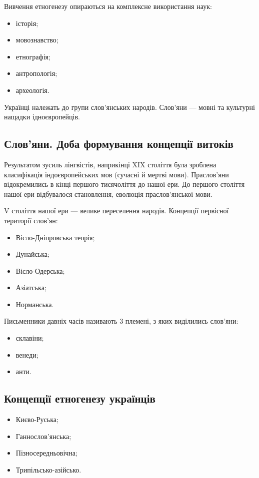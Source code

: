 \documentclass[a5paper,10pt,titlepage,pdftex,headsepline]{scrartcl}
\begin{document}
Вивчення етногенезу опираються на комплексне використання наук:
\begin{itemize}
	\item історія;
	\item мовознавство;
	\item етнографія;
	\item антропологія;
	\item археологія.
\end{itemize}

Українці належать до групи слов’янських народів.
Слов’яни --- мовні та культурні нащадки ідноєвропейців.
\subsection{Слов’яни. Доба формування концепції витоків}
Результатом зусиль лінгвістів, наприкінці XIX століття була зроблена класифікація індоєвропейських мов (сучасні й мертві мови).
Праслов’яни відокремились в кінці першого тисячоліття до нашої ери.
До першого століття нашої ери відбувалося становлення, еволюція праслов’янської мови.

V століття нашої ери --- велике переселення народів.
Концепції первісної території слов’ян:
\begin{itemize}
	\item Вісло-Дніпровська теорія;
	\item Дунайська;
	\item Вісло-Одерська;
	\item Азіатська;
	\item Норманська.
\end{itemize}

Письменники давніх часів називають 3 племені, з яких виділились слов’яни:
\begin{itemize}
	\item склавіни;
	\item венеди;
	\item анти.
\end{itemize}
\subsection{Концепції етногенезу українців}
\begin{itemize}
	\item Києво-Руська;
	\item Ганнослов’янська;
	\item Пізносередньовічна;
	\item Трипільсько-азійсько.
\end{itemize}
\end{document}
